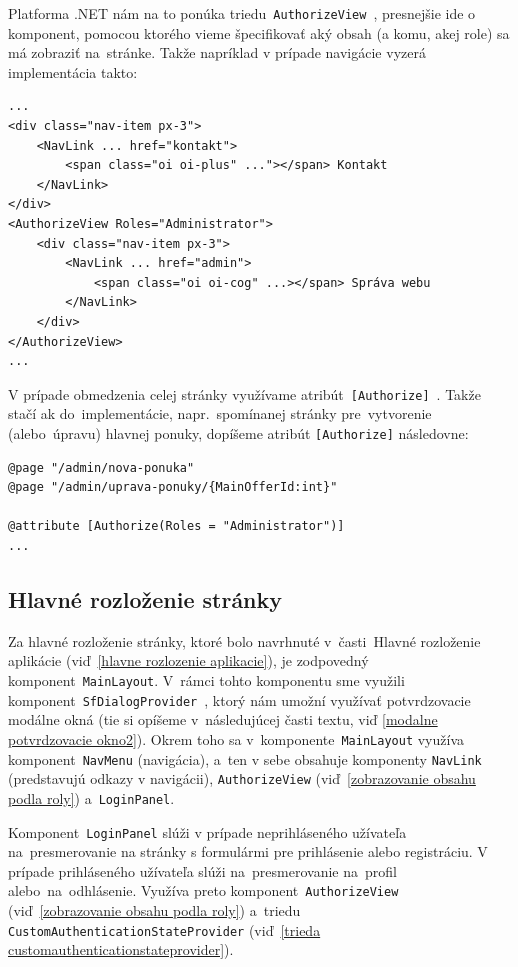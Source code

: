 Platforma .NET nám na to ponúka triedu~\texttt{AuthorizeView}~\cite{authorizeview}, presnejšie ide o komponent, pomocou ktorého vieme špecifikovať aký obsah (a komu, akej role) sa má zobraziť na~stránke. Takže napríklad v prípade navigácie vyzerá implementácia takto:

\begin{verbatim}
...
<div class="nav-item px-3">
    <NavLink ... href="kontakt">
        <span class="oi oi-plus" ..."></span> Kontakt
    </NavLink>
</div>
<AuthorizeView Roles="Administrator">
    <div class="nav-item px-3">
        <NavLink ... href="admin">
            <span class="oi oi-cog" ...></span> Správa webu
        </NavLink>
    </div>
</AuthorizeView>
...
\end{verbatim}

V prípade obmedzenia celej stránky využívame atribút~\texttt{[Authorize]}~\cite{authorize attribute}. Takže stačí ak do~implementácie, napr.~spomínanej stránky pre~vytvorenie (alebo~úpravu) hlavnej ponuky, dopíšeme atribút \verb|[Authorize]| následovne:

\begin{verbatim}
@page "/admin/nova-ponuka"
@page "/admin/uprava-ponuky/{MainOfferId:int}"

@attribute [Authorize(Roles = "Administrator")]
...
\end{verbatim}

\subsection{Hlavné rozloženie stránky}
\label{hlavne rozlozenie stranky}

Za hlavné rozloženie stránky, ktoré bolo navrhnuté v~časti~Hlavné rozloženie aplikácie (viď~\ref{hlavne rozlozenie aplikacie}), je zodpovedný komponent~\verb|MainLayout|. V~rámci tohto komponentu sme využili komponent~\texttt{SfDialogProvider}~\cite{sfdialogprovider}, ktorý nám umožní využívať potvrdzovacie modálne okná (tie si opíšeme v~následujúcej časti textu, viď \ref{modalne potvrdzovacie okno2}). Okrem toho sa v~komponente~\verb|MainLayout| využíva komponent~\verb|NavMenu| (navigácia), a~ten v sebe obsahuje komponenty \verb|NavLink| (predstavujú odkazy v navigácii), \verb|AuthorizeView| (viď~\ref{zobrazovanie obsahu podla roly}) a~\verb|LoginPanel|.

Komponent~\verb|LoginPanel| slúži v prípade neprihláseného užívateľa na~presmerovanie na stránky s formulármi pre prihlásenie alebo registráciu. V prípade prihláseného užívateľa slúži na~presmerovanie na~profil alebo~na~odhlásenie. Využíva preto komponent~\verb|AuthorizeView| (viď~\ref{zobrazovanie obsahu podla roly}) a~triedu \verb|CustomAuthenticationStateProvider| (viď~\ref{trieda customauthenticationstateprovider}).

